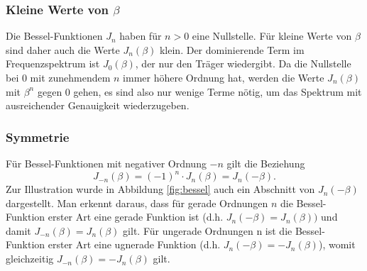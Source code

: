 \subsubsection{Kleine Werte von $\beta$}
Die Bessel-Funktionen $J_n$ haben für $n>0$ eine Nullstelle.
Für kleine Werte von $\beta$ sind daher auch die Werte $J_n(\beta)$ 
klein.
Der dominierende Term im Frequenzspektrum ist $J_0(\beta)$, der nur den Träger
wiedergibt.
Da die Nullstelle bei $0$ mit zunehmendem $n$ immer höhere Ordnung hat,
werden die Werte $J_n(\beta)$ mit $\beta^n$ gegen  0 gehen, es
sind also nur wenige Terme nötig, um das Spektrum mit ausreichender
Genauigkeit wiederzugeben.


\subsubsection{Symmetrie}
Für Bessel-Funktionen mit negativer Ordnung \(-n\) gilt die
Beziehung
\[
    J_{-n} (\beta) = (-1)^n \cdot J_n (\beta) = J_n (-\beta).
    \label{fm:eq:besselid:gerad:ungerade}
\]
Zur Illustration wurde in Abbildung \ref{fig:bessel} auch ein Abschnitt
von \(J_n (-\beta)\) dargestellt.
Man erkennt daraus, dass für gerade Ordnungen \(n\) die Bessel-Funktion
erster Art eine gerade Funktion ist 
(d.h. \(J_n (-\beta) = J_n (\beta))\) und damit
\(J_{-n} (\beta) = J_n (\beta)\) gilt.
Für ungerade Ordnungen n ist die Bessel-Funktion erster Art eine
ugnerade Funktion 
(d.h. \(J_n (-\beta) = -J_n (\beta)\)), womit gleichzeitig
\(J_{-n} (\beta) = -J_n (\beta)\) gilt.

